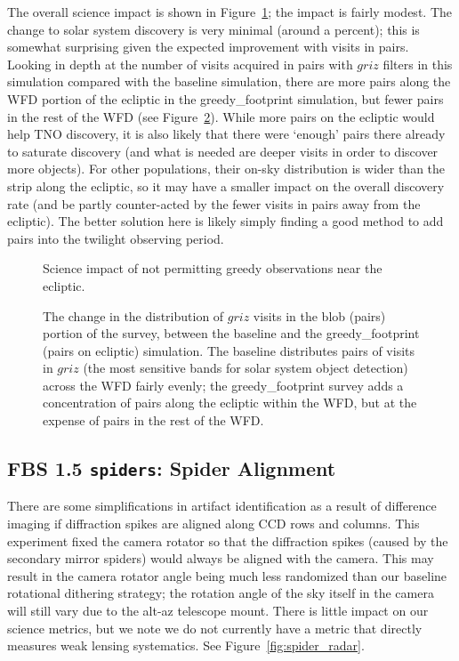 The overall science impact is shown in Figure~\ref{fig:greedy_radar}; the impact is fairly modest. The change to solar system discovery is very minimal (around a percent); this is somewhat surprising given the expected improvement with visits in pairs. Looking in depth at the number of visits acquired in pairs with $griz$ filters in this simulation compared with the baseline simulation, there are more pairs along the WFD portion of the ecliptic in the greedy\_footprint simulation, but fewer pairs in the rest of the WFD (see Figure~\ref{fig:greedy_nvisits}). While more pairs on the ecliptic would help TNO discovery, it is also likely that there were `enough' pairs there already to saturate discovery (and what is needed are deeper visits in order to discover more objects). For other populations, their on-sky distribution is wider than the strip along the ecliptic, so it may have a smaller impact on the overall discovery rate (and be partly counter-acted by the fewer visits in pairs away from the ecliptic). The better solution here is likely simply finding a good method to add pairs into the twilight observing period. 

\begin{figure}
\caption{Science impact of not permitting greedy observations near the ecliptic. }
\label{fig:greedy_radar}
\end{figure}

\begin{figure}
\caption{The change in the distribution of $griz$  visits in the blob (pairs) portion of the survey, between the baseline and the greedy\_footprint (pairs on ecliptic) simulation. The baseline distributes pairs of visits in $griz$ (the most sensitive bands for solar system object detection) across the WFD fairly evenly; the greedy\_footprint survey adds a concentration of pairs along the ecliptic within the WFD, but at the expense of pairs in the rest of the WFD.}
\label{fig:greedy_nvisits}
\end{figure}

\subsection{FBS 1.5 {\tt spiders}: Spider Alignment}\label{ss:spiders}

There are some simplifications in artifact identification as a result of difference imaging if diffraction spikes are aligned along CCD rows and columns. This experiment fixed the camera rotator so that the diffraction spikes (caused by the secondary mirror spiders) would always be aligned with the camera. This may result in the camera rotator angle being much less randomized than our baseline rotational dithering strategy; the rotation angle of the sky itself in the camera will still vary due to the alt-az telescope mount. There is little impact on our science metrics, but we note we do not currently have a metric that directly measures weak lensing systematics. See Figure~\ref{fig:spider_radar}. 


